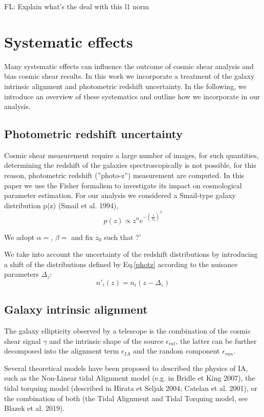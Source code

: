 \documentclass[twocolumn,twocolappendix]{aastex63}
\newcommand{\EiffL}[1]{{\color{cyan}FL: #1}}
\begin{document}
\EiffL{Explain what's the deal with this l1 norm}

\section{Systematic effects}
Many systematic effects can influence the outcome of cosmic shear analysis and bias cosmic shear results. 
In this work we incorporate a treatment of the galaxy intrinsic alignment and photometric redshift uncertainty.
In the following, we introduce an overview of these systematics and outline how we incorporate in our analysis.

\subsection{Photometric redshift uncertainty}
Cosmic shear measurement require a large number of images, for such quantities, determining the redshift of the galaxies spectroscopically is not possible, for this reason, photometric redshift (''photo-z'') measurement are computed.
In this paper we use the Fisher formalism to investigate its impact on cosmological parameter estimation.
For our analysis we considered a Smail-type galaxy distribution p(z) (Smail et al. 1994),
\begin{equation}\label{photz}
    p(z) \propto z^{\alpha} e^{-(\frac{z}{z_0})^{\beta}}
\end{equation}

 We adopt  $\alpha=$, $\beta =$ and fix $z_0$ such that ?'

 We take into account the uncertainty of the redshift distributions by introducing  a shift of the distributions defined by Eq.\ref{photz} according to the nuisance parameters $\Delta_z$:
 \begin{equation}
     n'_i(z)= n_i(z-\Delta_z)
 \end{equation}

\subsection{Galaxy intrinsic alignment}

The galaxy ellipticity observed by a telescope is the combination of the cosmic shear signal $\gamma$ and the intrinsic shape of the source $\epsilon_{int}$, the latter can be further decomposed into the alignment term $\epsilon_{IA}$ and the random component $\epsilon_{ran}$. 

Several theoretical models have been proposed to described the physics of IA, such as the Non-Linear tidal Alignment model (e.g. in Bridle et King 2007), the tidal torquing model (described in Hirata et Seljak 2004; Catelan et al. 2001), or the combination of both (the Tidal Alignment and Tidal Torquing model, see Blazek et al. 2019).
\end{document}
